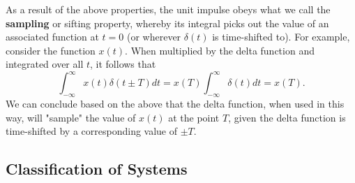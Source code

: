 \documentclass{article}
\begin{document}
As a result of the above properties, the unit impulse obeys what we call the \textbf{sampling} or sifting property, whereby its integral picks out the value of an associated function at \(t=0\) (or wherever \(\delta(t)\) is time-shifted to). For example, consider the function \(x(t)\). When multiplied by the delta function and integrated over all \(t\), it follows that \[
  \int_{-\infty}^{\infty}x(t)\delta(t\pm T)dt=x(T)\int_{-\infty}^{\infty}\delta(t)dt = x(T).
\]
We can conclude based on the above that the delta function, when used in this way, will "sample" the value of \(x(t)\) at the point \(T\), given the delta function is time-shifted by a corresponding value of \(\pm T\).

\subsection{Classification of Systems}
\end{document}
